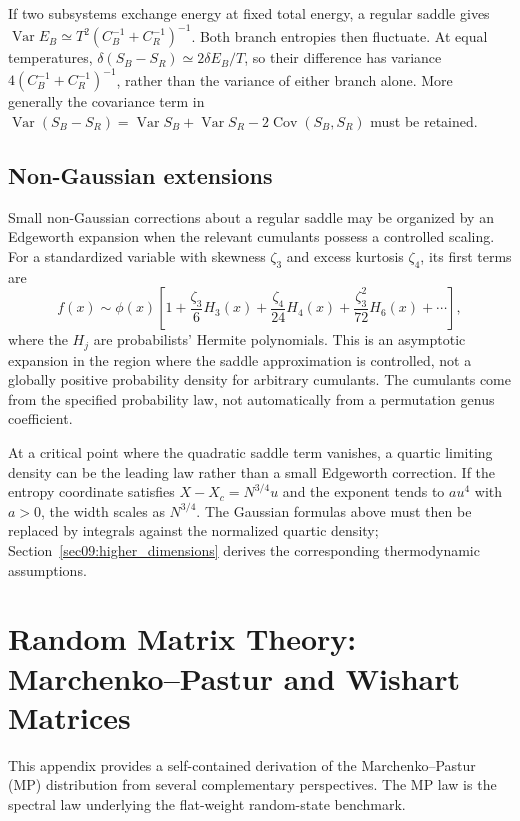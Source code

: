 \documentclass[11pt,letterpaper]{article}
\theoremstyle{plain}
\theoremstyle{definition}
\theoremstyle{remark}
\begin{document}
If two subsystems exchange energy at fixed total energy, a regular saddle gives
$\operatorname{Var}E_B\simeq T^2(C_B^{-1}+C_R^{-1})^{-1}$.
Both branch entropies then fluctuate.  At equal temperatures,
$\delta(S_B-S_R)\simeq2\delta E_B/T$, so their difference has variance
$4(C_B^{-1}+C_R^{-1})^{-1}$, rather than the variance of either branch alone.
More generally the covariance term in
$\operatorname{Var}(S_B-S_R)=\operatorname{Var}S_B+
\operatorname{Var}S_R-2\operatorname{Cov}(S_B,S_R)$ must be retained.

\subsection{Non-Gaussian extensions}

Small non-Gaussian corrections about a regular saddle may be organized by an
Edgeworth expansion when the relevant cumulants possess a controlled scaling.
For a standardized variable with skewness $\zeta_3$ and excess kurtosis
$\zeta_4$, its first terms are
\begin{equation}
 f(x)\sim\phi(x)\left[1+\frac{\zeta_3}{6}H_3(x)
 +\frac{\zeta_4}{24}H_4(x)+\frac{\zeta_3^2}{72}H_6(x)+\cdots\right],
 \label{eq16:edgeworth}
\end{equation}
where the $H_j$ are probabilists' Hermite polynomials.  This is an asymptotic
expansion in the region where the saddle approximation is controlled, not a
globally positive probability density for arbitrary cumulants.  The cumulants
come from the specified probability law, not automatically from a permutation
genus coefficient.

At a critical point where the quadratic saddle term vanishes, a quartic
limiting density can be the leading law rather than a small Edgeworth
correction.  If the entropy coordinate satisfies
$X-X_c=N^{3/4}u$ and the exponent tends to $a u^4$ with $a>0$, the width
scales as $N^{3/4}$.  The Gaussian formulas above must then be replaced by
integrals against the normalized quartic density; Section~\ref{sec09:higher_dimensions}
derives the corresponding thermodynamic assumptions.


\section{Random Matrix Theory: Marchenko--Pastur and Wishart Matrices}
\label{app:rmt}

This appendix provides a self-contained derivation of the Marchenko--Pastur
(MP) distribution from several complementary perspectives.  The MP law is the
spectral law underlying the flat-weight random-state benchmark.
\end{document}
